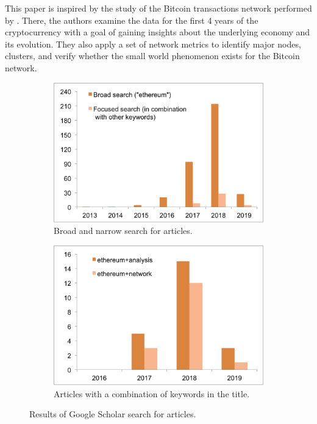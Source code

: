 This paper is inspired by the study of the Bitcoin transactions network performed by \cite{lischke2016analyzing}.
There, the authors examine the data for the first 4 years of the cryptocurrency with a goal of gaining insights about the underlying economy and its evolution.
They also apply a set of network metrics to identify major nodes, clusters, and verify whether the small world phenomenon exists for the Bitcoin network.

\begin{figure}[ht]
  \centering
  \begin{subfigure}[b]{0.49\linewidth}
    \includegraphics[width=\linewidth]{figures/search.png}
    \caption{Broad and narrow search for articles.}
    \label{fig:search_types}
  \end{subfigure}
  \begin{subfigure}[b]{0.49\linewidth}
    \includegraphics[width=\linewidth]{figures/narrow_search.png}
    \caption{Articles with a combination of keywords in the title.}
    \label{fig:narrow_search}
  \end{subfigure}
  \caption{Results of Google Scholar search for articles.}
  \label{fig:search}
\end{figure}

